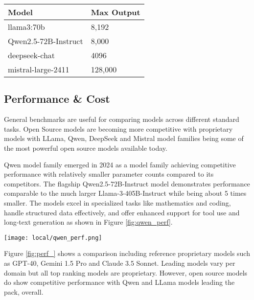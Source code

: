 \begin{margintable}[*-6]
\caption{Maximum Output Tokens for Selected Open Source Models. LLama as served by Ollama and Qwen as served by SambaNova sourced at \url{https://models.litellm.ai/} as of 01/09/2025.}
\begin{tabular}{ll}
\hline
Model & Max Output \\
\hline
llama3:70b & 8,192 \\
Qwen2.5-72B-Instruct & 8,000 \\
deepseek-chat & 4096 \\
mistral-large-2411 & 128,000 \\
\hline
\end{tabular}
\label{tab:output-token}
\end{margintable}

\subsection{Performance \& Cost}

General benchmarks are useful for comparing models across different standard tasks. Open Source models are becoming more competitive with proprietary models with LLama, Qwen, DeepSeek and Mistral model families being some of the most powerful open source models available today.

Qwen model family  emerged in 2024 as a model family achieving competitive performance with relatively smaller parameter counts compared to its competitors. The flagship Qwen2.5-72B-Instruct model demonstrates performance comparable to the much larger Llama-3-405B-Instruct while being about 5 times smaller. The models excel in specialized tasks like mathematics and coding, handle structured data effectively, and offer enhanced support for tool use and long-text generation as shown in Figure \ref{fig:qwen_perf}.

\begin{figure*}[h!]
\centering
\texttt{[image: local/qwen\_perf.png]}
\caption{Qwen Performance in comparison with key open source models \cite{qwen2024qwen25technicalreport}.}
\label{fig:qwen_perf}
\end{figure*}

Figure \ref{fig:perf_} shows a comparison including reference proprietary models such as GPT-40, Gemini 1.5 Pro and Claude 3.5 Sonnet. Leading models vary per domain but all top ranking models are proprietary. However, open source models do show competitive performance with Qwen and LLama models leading the pack, overall.

